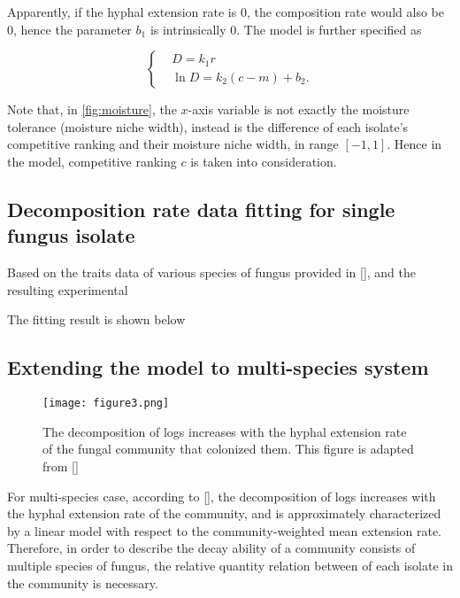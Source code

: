 Apparently, if the hyphal extension rate is $0$, the composition rate would also be $0$, hence the parameter $b_1$ is intrinsically $0$. The model is further specified as

\begin{equation}\label{eq:decay-ability}
    \left\{\begin{aligned} &
        D = k_1r \\ &
        \ln D = k_2(c - m) + b_2.
    \end{aligned}\right.
\end{equation}


Note that, in \ref{fig:moisture}, the $x$-axis variable is not exactly the moisture tolerance (moisture niche width), instead is the difference of each isolate’s competitive ranking and their moisture niche width, in range $[-1, 1]$. Hence in the model, competitive ranking $c$ is taken into consideration.


\subsection{Decomposition rate data fitting for single fungus isolate}

Based on the traits data of various species of fungus provided in [], and the resulting experimental 

The fitting result is shown below




\subsection{Extending the model to multi-species system}

\begin{figure}\label{fig:community}
    \begin{minipage}{0.4\textwidth}
        \texttt{[image: figure3.png]}
    \end{minipage}
    \begin{minipage}{0.5\textwidth}
        \caption{The decomposition of logs increases with the hyphal extension rate of the fungal community that colonized them. This figure is adapted from []}
    \end{minipage}
\end{figure}

For multi-species case, according to [], the decomposition of logs increases with the hyphal extension rate of the community, and is approximately characterized by a linear model with respect to the community-weighted mean extension rate. Therefore, in order to describe the decay ability of a community consists of multiple species of fungus, the relative quantity relation between of each isolate in the community is necessary.

